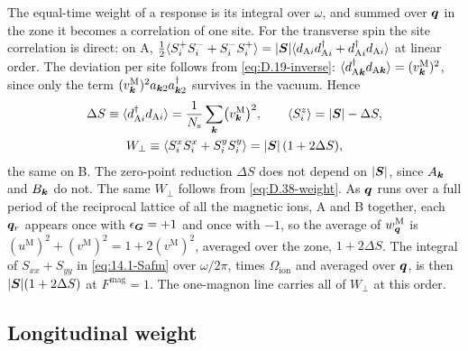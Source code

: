 The equal-time weight of a response is its integral over $\omega$, and summed over $\bm{q}$ in the zone it becomes a correlation of one site. For the transverse spin the site correlation is direct: on A, $\frac12\langle S^+_iS^-_i + S^-_iS^+_i\rangle = |\bm{S}|\langle d_{\mathrm{A}i}d^\dagger_{\mathrm{A}i} + d^\dagger_{\mathrm{A}i}d_{\mathrm{A}i}\rangle$ at linear order. The deviation per site follows from \cref{eq:D.19-inverse}: $\langle d^\dagger_{\mathrm{A}\bm{k}}d_{\mathrm{A}\bm{k}}\rangle = (v^{\mathrm{M}}_{\bm{k}})^2$, since only the term $(v^{\mathrm{M}}_{\bm{k}})^2a_{\bm{k}2}a^\dagger_{\bm{k}2}$ survives in the vacuum. Hence
\begin{equation}
  \begin{gathered}
  \Delta S \equiv \langle d^\dagger_{\mathrm{A}i}d_{\mathrm{A}i}\rangle = \frac{1}{N_{\mathrm{s}}}\sum_{\bm{k}}\bigl(v^{\mathrm{M}}_{\bm{k}}\bigr)^2, \qquad
  \langle S^z_i\rangle = |\bm{S}| - \Delta S, \\
  W_\perp \equiv \langle S^x_iS^x_i + S^y_iS^y_i\rangle = |\bm{S}|\,(1 + 2\Delta S) ,
  \end{gathered}
  \label{eq:D.38-Wperp}
\end{equation}
the same on B. The zero-point reduction $\Delta S$ does not depend on $|\bm{S}|$, since $A_{\bm{k}}$ and $B_{\bm{k}}$ do not. The same $W_\perp$ follows from \cref{eq:D.38-weight}. As $\bm{q}$ runs over a full period of the reciprocal lattice of all the magnetic ions, A and B together, each $\bm{q}_r$ appears once with $\epsilon_{\bm{G}} = +1$ and once with $-1$, so the average of $w^{\mathrm{M}}_{\bm{q}}$ is $(u^{\mathrm{M}})^2 + (v^{\mathrm{M}})^2 = 1 + 2(v^{\mathrm{M}})^2$, averaged over the zone, $1 + 2\Delta S$. The integral of $S_{xx} + S_{yy}$ in \cref{eq:14.1-Safm} over $\omega/2\pi$, times $\Omega_{\mathrm{ion}}$ and averaged over $\bm{q}$, is then $|\bm{S}|(1 + 2\Delta S)$ at $F^{\mathrm{mag}} = 1$. The one-magnon line carries all of $W_\perp$ at this order.

\subsection*{Longitudinal weight}

